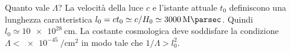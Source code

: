 Quanto vale $\Lambda$?  La velocità della luce $c$ e l'istante attuale $t_0$
definiscono una lunghezza caratteristica
$l_0 = c t_0 \simeq c/H_0 \simeq \SI{3000}{\mega\parsec}$.  Quindi
$l_0 \simeq \SI{10e28}{\centi\metre}$.  La costante cosmologica deve soddisfare
la condizione
$\Lambda < \SI[per-mode=reciprocal]{e-45}{\per\centi\metre\squared}$ in modo
tale che $1/\Lambda > l_0^2$.

